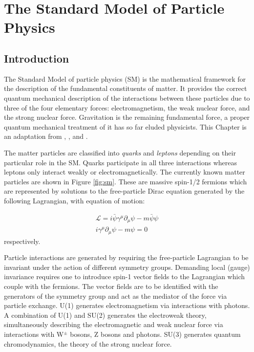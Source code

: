 \chapter{The Standard Model of Particle Physics}
\label{chap:sm}

\section{Introduction}

The Standard Model of particle physics (SM) is the mathematical framework for the description of the fundamental constituents of matter. It provides the correct quantum mechanical description of the interactions between these particles due to three of the four elementary forces: electromagnetism, the weak nuclear force, and the strong nuclear force. Gravitation is the remaining fundamental force, a proper quantum mechanical treatment of it has so far eluded physicists. This Chapter is an adaptation from \cite{thomson}, \cite{halzmar}, and \cite{griffiths}.

The matter particles are classified into \textit{quarks} and \textit{leptons} depending on their particular role in the SM. Quarks participate in all three interactions whereas leptons only interact weakly or electromagnetically. The currently known matter particles are shown in Figure \ref{fig:sm}. These are massive spin-1/2 fermions which are represented by solutions to the free-particle Dirac equation generated by the following Lagrangian, with equation of motion:

\begin{equation}
\begin{array}{l}
\mathcal{L} = i\bar{\psi}\gamma^{\mu}\partial_{\mu}\psi - m\bar{\psi}\psi\\
i\gamma^{\mu}\partial_{\mu}\psi - m\psi = 0
\end{array}
\end{equation}
respectively.

Particle interactions are generated by requiring the free-particle Lagrangian to be invariant under the action of different symmetry groups. Demanding local (gauge) invariance requires one to introduce spin-1 vector fields to the Lagrangian which couple with the fermions. The vector fields are to be identified with the generators of the symmetry group and act as the mediator of the force via particle exchange. U(1) generates electromagnetism via interactions with photons. A combination of U(1) and SU(2) generates the electroweak theory, simultaneously describing the electromagnetic and weak nuclear force via interactions with W$^{\pm}$ bosons, Z bosons and photons. SU(3) generates quantum chromodynamics, the theory of the strong nuclear force.

